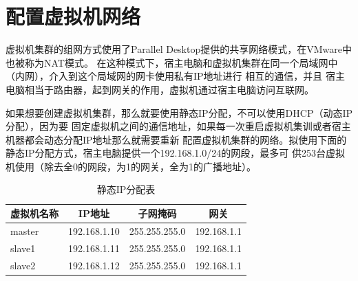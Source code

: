 \documentclass{article}
\begin{document}
\section{配置虚拟机网络}
\indent 虚拟机集群的组网方式使用了Parallel Desktop提供的共享网络模式，在VMware中也被称为NAT模式。
在这种模式下，宿主电脑和虚拟机集群在同一个局域网中（内网），介入到这个局域网的网卡使用私有IP地址进行
相互的通信，并且
宿主电脑相当于路由器，起到网关的作用，虚拟机通过宿主电脑访问互联网。

\indent 如果想要创建虚拟机集群，那么就要使用静态IP分配，不可以使用DHCP（动态IP分配），因为要
固定虚拟机之间的通信地址，如果每一次重启虚拟机集训或者宿主机器都会动态分配IP地址那么就需要重新
配置虚拟机集群的网络。拟使用下面的静态IP分配方式，宿主电脑提供一个192.168.1.0/24的网段，最多可
供253台虚拟机使用（除去全0的网段，为1的网关，全为1的广播地址）。
\begin{table}
    \centering
    \caption{静态IP分配表}
    \begin{tabular}{@{}lccc@{}}
        \toprule
        虚拟机名称 & IP地址 & 子网掩码 & 网关 \\ \midrule
        master & 192.168.1.10 & 255.255.255.0 & 192.168.1.1 \\
        slave1 & 192.168.1.11 & 255.255.255.0 & 192.168.1.1 \\
        slave2 & 192.168.1.12 & 255.255.255.0 & 192.168.1.1 \\
        \bottomrule
    \end{tabular}
\end{table}
\end{document}
